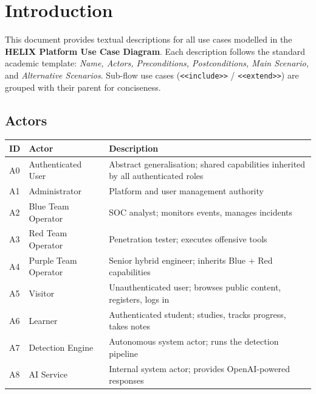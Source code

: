 \documentclass[12pt,a4paper]{report}
\begin{document}
\chapter*{Introduction}

This document provides textual descriptions for all use cases modelled in the
\textbf{HELIX Platform Use Case Diagram}. Each description follows the standard academic
template: \textit{Name, Actors, Preconditions, Postconditions, Main Scenario,} and
\textit{Alternative Scenarios}. Sub-flow use cases (\texttt{<<include>>} / \texttt{<<extend>>})
are grouped with their parent for conciseness.

\section*{Actors}

\begin{center}
    \begin{tabular}{C{1.0cm} L{3.2cm} L{6.5cm}}
        \toprule
        \textbf{ID} & \textbf{Actor} & \textbf{Description} \\
        \midrule
        A0 & Authenticated User & Abstract generalisation; shared capabilities inherited by all authenticated roles \\
        A1 & Administrator & Platform and user management authority \\
        A2 & Blue Team Operator & SOC analyst; monitors events, manages incidents \\
        A3 & Red Team Operator & Penetration tester; executes offensive tools \\
        A4 & Purple Team Operator & Senior hybrid engineer; inherits Blue + Red capabilities \\
        A5 & Visitor & Unauthenticated user; browses public content, registers, logs in \\
        A6 & Learner & Authenticated student; studies, tracks progress, takes notes \\
        A7 & Detection Engine & Autonomous system actor; runs the detection pipeline \\
        A8 & AI Service & Internal system actor; provides OpenAI-powered responses \\
        \bottomrule
    \end{tabular}
\end{center}
\end{document}
